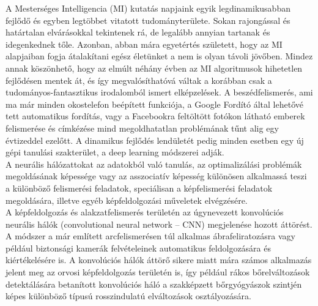 
A Mesterséges Intelligencia (MI) kutatás napjaink egyik legdinamikusabban fejlődő és egyben legtöbbet vitatott tudományterülete. Sokan rajongással és határtalan elvárásokkal tekintenek rá, de legalább annyian tartanak és idegenkednek tőle. Azonban, abban mára egyetértés született, hogy az MI alapjaiban fogja átalakítani egész életünket a nem is olyan távoli jövőben. Mindez annak köszönhető, hogy az elmúlt néhány évben az MI algoritmusok hihetetlen fejlődésen mentek át, és így megvalósíthatóvá váltak a korábban csak a tudományos-fantasztikus irodalomból ismert elképzelések. A beszédfelismerés, ami ma már minden okostelefon beépített funkciója, a Google Fordító által lehetővé tett automatikus fordítás, vagy a Facebookra feltöltött fotókon látható emberek felismerése és címkézése mind megoldhatatlan problémának tűnt alig egy évtizeddel ezelőtt. A dinamikus fejlődés lendületét pedig minden esetben egy új gépi tanulási szakterület, a deep learning módszerei adják. \\

A neurális hálózattokat az adatokból való tanulás, az optimalizálási problémák megoldásának képessége vagy az asszociatív képesség különösen alkalmassá teszi a különböző felismerési feladatok, speciálisan a képfelismerési feladatok megoldására, illetve egyéb képfeldolgozási műveletek elvégzésére.\\ 

A képfeldolgozás és alakzatfelismerés területén az úgynevezett konvolúciós neurális hálók (convolutional neural network – CNN) megjelenése hozott áttörést. A módszer a már említett arcfelismerésen túl alkalmas ábrafeliratozásra vagy például biztonsági kamerák felvételeinek automatikus feldolgozására és kiértékelésére is. A konvolúciós hálók áttörő sikere miatt mára számos alkalmazás jelent meg az orvosi képfeldolgozás területén is, így például rákos bőrelváltozások detektálására betanított konvolúciós háló a szakképzett bőrgyógyászok szintjén képes különböző típusú rosszindulatú elváltozások osztályozására.\\ 